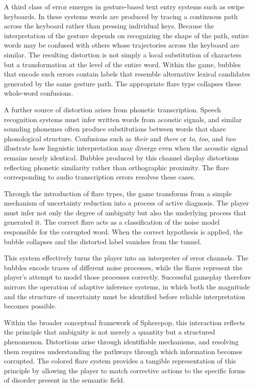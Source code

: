 \documentclass[11pt]{article}
\begin{document}
A third class of error emerges in gesture-based text entry systems such as swipe keyboards. In these systems words are produced by tracing a continuous path across the keyboard rather than pressing individual keys. Because the interpretation of the gesture depends on recognizing the shape of the path, entire words may be confused with others whose trajectories across the keyboard are similar. The resulting distortion is not simply a local substitution of characters but a transformation at the level of the entire word. Within the game, bubbles that encode such errors contain labels that resemble alternative lexical candidates generated by the same gesture path. The appropriate flare type collapses these whole-word confusions.

A further source of distortion arises from phonetic transcription. Speech recognition systems must infer written words from acoustic signals, and similar sounding phonemes often produce substitutions between words that share phonological structure. Confusions such as \emph{their} and \emph{there} or \emph{to}, \emph{too}, and \emph{two} illustrate how linguistic interpretation may diverge even when the acoustic signal remains nearly identical. Bubbles produced by this channel display distortions reflecting phonetic similarity rather than orthographic proximity. The flare corresponding to audio transcription errors resolves these cases.

Through the introduction of flare types, the game transforms from a simple mechanism of uncertainty reduction into a process of active diagnosis. The player must infer not only the degree of ambiguity but also the underlying process that generated it. The correct flare acts as a classification of the noise model responsible for the corrupted word. When the correct hypothesis is applied, the bubble collapses and the distorted label vanishes from the tunnel.

This system effectively turns the player into an interpreter of error channels. The bubbles encode traces of different noise processes, while the flares represent the player's attempt to model those processes correctly. Successful gameplay therefore mirrors the operation of adaptive inference systems, in which both the magnitude and the structure of uncertainty must be identified before reliable interpretation becomes possible.

Within the broader conceptual framework of Spherepop, this interaction reflects the principle that ambiguity is not merely a quantity but a structured phenomenon. Distortions arise through identifiable mechanisms, and resolving them requires understanding the pathways through which information becomes corrupted. The colored flare system provides a tangible representation of this principle by allowing the player to match corrective actions to the specific forms of disorder present in the semantic field.
\end{document}
